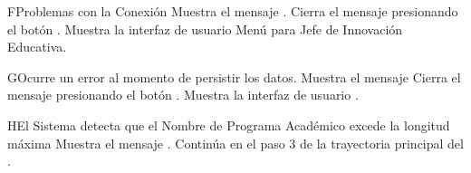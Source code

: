 \begin{UCtrayectoriaA}{F}{Problemas con la Conexión}
    \UCpaso Muestra el mensaje .
    \UCpaso[\UCactor] Cierra el mensaje presionando el botón .
\UCpaso Muestra la interfaz de usuario Menú para Jefe de Innovación Educativa.
\end{UCtrayectoriaA}

\begin{UCtrayectoriaA}{G}{Ocurre un error al momento de persistir los datos.}
    \UCpaso Muestra el mensaje 
    \UCpaso[\UCactor] Cierra el mensaje presionando el botón .
    \UCpaso Muestra la interfaz de usuario .
\end{UCtrayectoriaA}
\begin{UCtrayectoriaA}{H}{El Sistema detecta que el Nombre de Programa Académico excede la longitud máxima}
    \UCpaso Muestra el mensaje .
    \UCpaso Continúa en el paso 3 de la trayectoria principal del .
\end{UCtrayectoriaA}